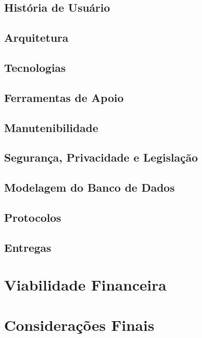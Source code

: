 \documentclass[
	12pt,				%
	openany,			%
	twoside,			%
	a4paper,			%
	english,			%
	french,				%
	spanish,			%
	brazil				%
	]{abntex2}
\begin{document}
\section{História de Usuário}

\section{Arquitetura}

\section{Tecnologias}

\section{Ferramentas de Apoio}

\section{Manutenibilidade}

\section{Segurança, Privacidade e Legislação}

\section{Modelagem do Banco de Dados}

\section{Protocolos}

\section{Entregas}

\chapter{Viabilidade Financeira}

\chapter{Considerações Finais}

%
\end{document}
